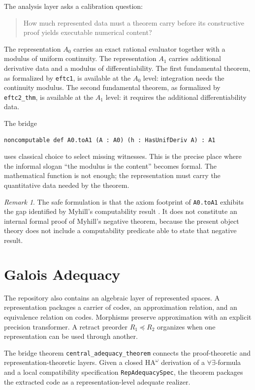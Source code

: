 \documentclass[11pt,a4paper]{article}
\theoremstyle{definition}
\theoremstyle{remark}
\newtheorem{remark}[theorem]{Remark}
\newcommand{\HAomega}{\ensuremath{\mathrm{HA}^{\omega}}}
\newcommand{\lean}[1]{\texttt{\nolinkurl{#1}}}
\begin{document}
The analysis layer asks a calibration question:

\begin{quote}
How much represented data must a theorem carry before its constructive proof
yields executable numerical content?
\end{quote}

The representation \(A_0\) carries an exact rational evaluator together with a
modulus of uniform continuity.  The representation \(A_1\) carries additional
derivative data and a modulus of differentiability.  The first fundamental
theorem, as formalized by \lean{eftc1}, is available at the \(A_0\) level:
integration needs the continuity modulus.  The second fundamental theorem, as
formalized by \lean{eftc2_thm}, is available at the \(A_1\) level: it requires
the additional differentiability data.

The bridge
\begin{lstlisting}[language=Lean]
noncomputable def A0.toA1 (A : A0) (h : HasUnifDeriv A) : A1
\end{lstlisting}
uses classical choice to select missing witnesses.  This is the precise place
where the informal slogan ``the modulus is the content'' becomes formal.  The
mathematical function is not enough; the representation must carry the
quantitative data needed by the theorem.

\begin{remark}
The safe formulation is that the axiom footprint of \lean{A0.toA1} exhibits
the gap identified by Myhill's computability result \cite{myhill1971}.  It
does not constitute an internal formal proof of Myhill's negative theorem,
because the present object theory does not include a computability predicate
able to state that negative result.
\end{remark}

\section{Galois Adequacy}

The repository also contains an algebraic layer of represented spaces.  A
representation packages a carrier of codes, an approximation relation, and an
equivalence relation on codes.  Morphisms preserve approximation with an
explicit precision transformer.  A retract preorder \(R_1 \preceq R_2\)
organizes when one representation can be used through another.

The bridge theorem \lean{central_adequacy_theorem} connects the
proof-theoretic and representation-theoretic layers.  Given a closed \HAomega
derivation of a \(\forall\exists\)-formula and a local compatibility
specification \lean{RepAdequacySpec}, the theorem packages the extracted code
as a representation-level adequate realizer.
\end{document}
